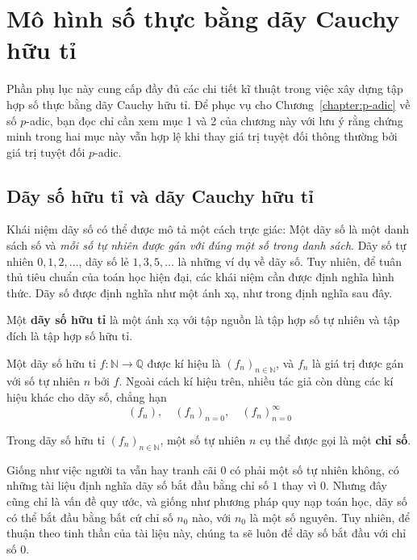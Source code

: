 \chapter{Mô hình số thực bằng dãy Cauchy hữu tỉ}

Phần phụ lục này cung cấp đầy đủ các chi tiết kĩ thuật trong việc xây dựng tập hợp số thực bằng dãy Cauchy hữu tỉ. Để phục vụ cho Chương~\ref{chapter:p-adic} về số $p$-adic, bạn đọc chỉ cần xem mục 1 và 2 của chương này với lưu ý rằng chứng minh trong hai mục này vẫn hợp lệ khi thay giá trị tuyệt đối thông thường bởi giá trị tuyệt đối $p$-adic.

\section{Dãy số hữu tỉ và dãy Cauchy hữu tỉ}

Khái niệm dãy số có thể được mô tả một cách trực giác: Một dãy số là một danh sách số và \textit{mỗi số tự nhiên được gán với đúng một số trong danh sách}. Dãy số tự nhiên $0, 1, 2, \ldots$, dãy số lẻ $1, 3, 5, \ldots$ là những ví dụ về dãy số. Tuy nhiên, để tuân thủ tiêu chuẩn của toán học hiện đại, các khái niệm cần được định nghĩa hình thức. Dãy số được định nghĩa như một ánh xạ, như trong định nghĩa sau đây.

\begin{definition}
    Một \textbf{dãy số hữu tỉ} là một ánh xạ với tập nguồn là tập hợp số tự nhiên và tập đích là tập hợp số hữu tỉ.

    \noindent Một dãy số hữu tỉ $f: \mathbb{N}\to\mathbb{Q}$ được kí hiệu là ${(f_{n})}_{n\in\mathbb{N}}$, và $f_{n}$ là giá trị được gán với số tự nhiên $n$ bởi $f$. Ngoài cách kí hiệu trên, nhiều tác giả còn dùng các kí hiệu khác cho dãy số, chẳng hạn
    \[
        {(f_{n})}, \quad {(f_{n})}_{n=0}, \quad {(f_{n})}^{\infty}_{n=0}
    \]

    \noindent Trong dãy số hữu tỉ ${(f_{n})}_{n\in\mathbb{N}}$, một số tự nhiên $n$ cụ thể được gọi là một \textbf{chỉ số}.
\end{definition}

Giống như việc người ta vẫn hay tranh cãi $0$ có phải một số tự nhiên không, có những tài liệu định nghĩa dãy số bắt đầu bằng chỉ số $1$ thay vì $0$. Nhưng đây cũng chỉ là vấn đề quy ước, và giống như phương pháp quy nạp toán học, dãy số có thể bắt đầu bằng bất cứ chỉ số $n_{0}$ nào, với $n_{0}$ là một số nguyên. Tuy nhiên, để thuận theo tinh thần của tài liệu này, chúng ta sẽ luôn để dãy số bắt đầu với chỉ số $0$.

